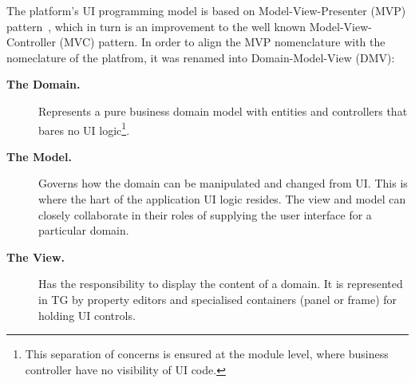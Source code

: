   The platform's UI programming model is based on Model-View-Presenter (MVP) pattern~\cite{BoGl2000}, which in turn is an improvement to the well known Model-View-Controller (MVC) pattern.  
  In order to align the MVP nomenclature with the nomeclature of the platfrom, it was renamed into Domain-Model-View (DMV):
  \begin{description}
    \item[\textbf{The Domain.}] Represents a pure business domain model with entities and controllers that bares no UI logic\footnote{This separation of concerns is ensured at the module level, where business controller have no visibility of UI code.}.
    \item [\textbf{The Model.}] Governs how the domain can be manipulated and changed from UI. 
	This is where the hart of the application UI logic resides. The view and model can closely collaborate in their roles of supplying the user interface for a particular domain.
    \item[\textbf{The View.}] Has the responsibility to display the content of a domain. 
	It is represented in TG by property editors and specialised containers (panel or frame) for holding UI controls.    
  \end{description}

